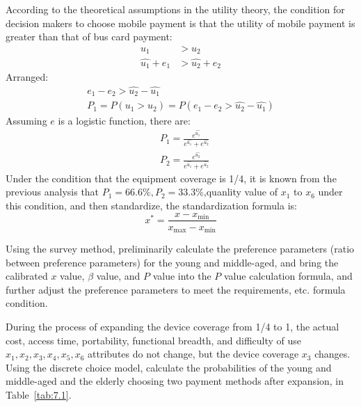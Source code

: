 \documentclass[../mcmpaper]{subfiles}
\begin{document}
\par
According to the theoretical assumptions in the utility theory, the condition for decision makers to choose mobile payment is that the utility of mobile payment is greater than that of bus card payment:
\begin{equation}
\begin{aligned}
u_{1} &>u_{2} \\
\widehat{u_{1}}+e_{1} &>\widehat{u_{2}}+e_{2}
\end{aligned}
\end{equation}
Arranged:
\begin{equation}
\begin{gathered}
e_{1}-e_{2}>\widehat{u_{2}}-\widehat{u_{1}} \\
P_{1}=P\left(u_{1}>u_{2}\right)=P\left(e_{1}-e_{2}>\widehat{u_{2}}-\widehat{u_{1}}\right)
\end{gathered}
\end{equation}
Assuming $e$ is a logistic function, there are:
\begin{equation}
\begin{aligned}
&P_{1}=\frac{e^{\widehat{u_{1}}}}{e^{\widehat{u_{1}}}+e^{\widehat{u_{2}}}} \\
&P_{2}=\frac{e^{\widehat{u_{2}}}}{e^{\widehat{u_{1}}}+e^{\widehat{u_{2}}}}
\end{aligned}
\end{equation}
Under the condition that the equipment coverage is 1/4, it is known from the previous analysis that $P_1=66.6\%, P_2=33.3\%$,quanlity value of $x_1$ to $x_6$ under this condition, and then standardize, the standardization formula is:
\begin{equation}
x^{*}=\frac{x-x_{\min }}{x_{\max }-x_{\min }}
\end{equation}
\par
Using the survey method, preliminarily calculate the preference parameters (ratio between preference parameters) for the young and middle-aged, and bring the calibrated $x$ value, $\beta$ value, and $P$ value into the $P$ value calculation formula, and further adjust the preference parameters to meet the requirements, etc. formula condition.
\par
During the process of expanding the device coverage from 1/4 to 1, the actual cost, access time, portability, functional breadth, and difficulty of use $x_1, x_2, x_3, x_4, x_5, x_6$ attributes do not change, but the device coverage $x_3$ changes. Using the discrete choice model, calculate the probabilities of the young and middle-aged and the elderly choosing two payment methods after expansion, in Table~\ref{tab:7.1}.
\end{document}
